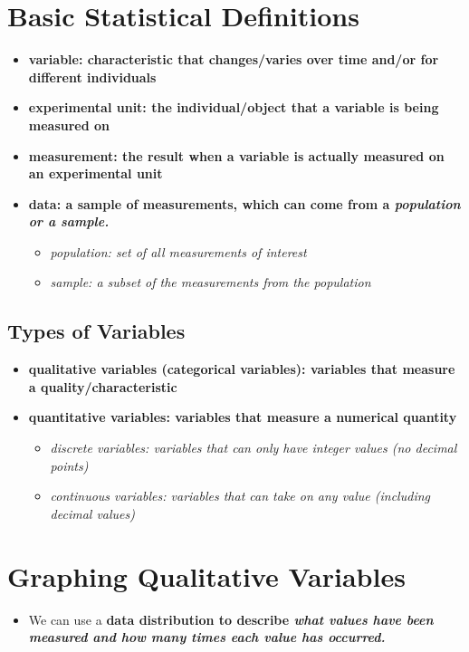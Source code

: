 \section{Basic Statistical Definitions}

\begin{itemize}
    \item \bf{variable:} characteristic that changes/varies over time and/or for different individuals
    \item \bf{experimental unit:} the individual/object that a variable is being measured on
    \item \bf{measurement:} the result when a variable is actually measured on an experimental unit
    \item \bf{data:} a sample of measurements, which can come from a \it{population} or a \it{sample}.
    \begin{itemize}
        \item \it{population:} set of all measurements of interest
        \item \it{sample:} a subset of the measurements from the population
    \end{itemize}
\end{itemize}

\subsection{Types of Variables}

\begin{itemize}
    \item \bf{qualitative variables (categorical variables):} variables that measure a quality/characteristic
    \item \bf{quantitative variables:} variables that measure a numerical quantity
    \begin{itemize}
        \item \it{discrete variables:} variables that can only have integer values (no decimal points)
        \item \it{continuous variables:} variables that can take on any value (including decimal values)
    \end{itemize}
\end{itemize}


\section{Graphing Qualitative Variables}

\begin{itemize}
    \item We can use a \bf{data distribution} to describe \it{what values} have been measured and \it{how many} times each value has occurred. 
\end{itemize}